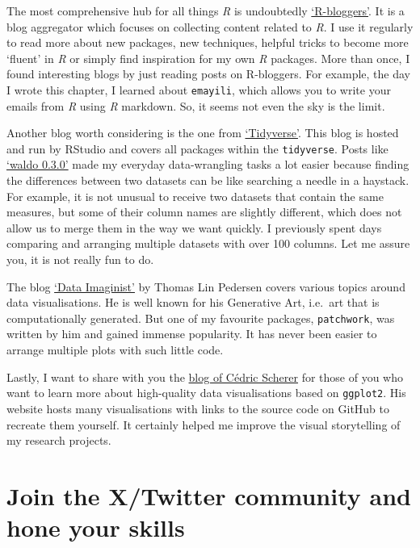 \documentclass[
  letterpaper,
  DIV=11,
  numbers=noendperiod]{scrreprt}
\begin{document}
The most comprehensive hub for all things \emph{R} is undoubtedly
\href{https://www.r-bloggers.com}{`R-bloggers'}. It is a blog aggregator
which focuses on collecting content related to \emph{R}. I use it
regularly to read more about new packages, new techniques, helpful
tricks to become more `fluent' in \emph{R} or simply find inspiration
for my own \emph{R} packages. More than once, I found interesting blogs
by just reading posts on R-bloggers. For example, the day I wrote this
chapter, I learned about \texttt{emayili}, which allows you to write
your emails from \emph{R} using \emph{R} markdown. So, it seems not even
the sky is the limit.

Another blog worth considering is the one from
\href{https://www.tidyverse.org/blog/}{`Tidyverse'}. This blog is hosted
and run by RStudio and covers all packages within the
\texttt{tidyverse}. Posts like
\href{https://www.tidyverse.org/blog/2021/08/waldo-0-3-0/}{`waldo
0.3.0'} made my everyday data-wrangling tasks a lot easier because
finding the differences between two datasets can be like searching a
needle in a haystack. For example, it is not unusual to receive two
datasets that contain the same measures, but some of their column names
are slightly different, which does not allow us to merge them in the way
we want quickly. I previously spent days comparing and arranging
multiple datasets with over 100 columns. Let me assure you, it is not
really fun to do.

The blog \href{https://www.data-imaginist.com}{`Data Imaginist'} by
Thomas Lin Pedersen covers various topics around data visualisations. He
is well known for his Generative Art, i.e.~art that is computationally
generated. But one of my favourite packages, \texttt{patchwork}, was
written by him and gained immense popularity. It has never been easier
to arrange multiple plots with such little code.

Lastly, I want to share with you the
\href{https://www.cedricscherer.com/top/dataviz/}{blog of Cédric
Scherer} for those of you who want to learn more about high-quality data
visualisations based on \texttt{ggplot2}. His website hosts many
visualisations with links to the source code on GitHub to recreate them
yourself. It certainly helped me improve the visual storytelling of my
research projects.

\section{Join the X/Twitter community and hone your
skills}\label{sec-next-steps-twitter}
\end{document}
